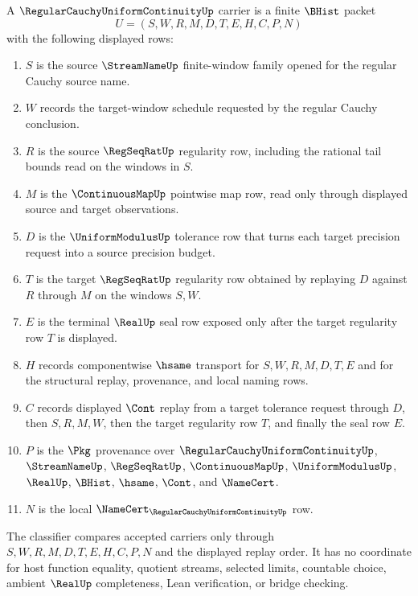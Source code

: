 \begin{definition}
\label{def:regular-cauchy-uniform-continuity-carrier}
A $\RegularCauchyUniformContinuityUp$ carrier is a finite $\BHist$ packet
$$
U=(S,W,R,M,D,T,E,H,C,P,N)
$$
with the following displayed rows:
\begin{enumerate}
\item $S$ is the source $\StreamNameUp$ finite-window family opened for the regular Cauchy source name.
\item $W$ records the target-window schedule requested by the regular Cauchy conclusion.
\item $R$ is the source $\RegSeqRatUp$ regularity row, including the rational tail bounds read on the windows in $S$.
\item $M$ is the $\ContinuousMapUp$ pointwise map row, read only through displayed source and target observations.
\item $D$ is the $\UniformModulusUp$ tolerance row that turns each target precision request into a source precision budget.
\item $T$ is the target $\RegSeqRatUp$ regularity row obtained by replaying $D$ against $R$ through $M$ on the windows $S,W$.
\item $E$ is the terminal $\RealUp$ seal row exposed only after the target regularity row $T$ is displayed.
\item $H$ records componentwise $\hsame$ transport for $S,W,R,M,D,T,E$ and for the structural replay, provenance, and local naming rows.
\item $C$ records displayed $\Cont$ replay from a target tolerance request through $D$, then $S,R,M,W$, then the target regularity row $T$, and finally the seal row $E$.
\item $P$ is the $\Pkg$ provenance over $\RegularCauchyUniformContinuityUp$, $\StreamNameUp$, $\RegSeqRatUp$, $\ContinuousMapUp$, $\UniformModulusUp$, $\RealUp$, $\BHist$, $\hsame$, $\Cont$, and $\NameCert$.
\item $N$ is the local $\NameCert_{\RegularCauchyUniformContinuityUp}$ row.
\end{enumerate}
The classifier compares accepted carriers only through $S,W,R,M,D,T,E,H,C,P,N$ and the displayed replay order. It has no coordinate for host function equality, quotient streams, selected limits, countable choice, ambient $\RealUp$ completeness, Lean verification, or bridge checking.
\end{definition}

